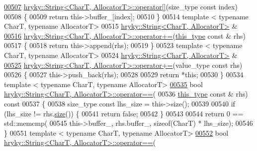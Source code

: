 \begin{DoxyCode}
\hypertarget{string_8h_source_l00507}{}\hyperlink{classhryky_1_1_string_a069059a9fefbffa776be63db1594561b}{00507} \hyperlink{classhryky_1_1_string}{hryky::String<CharT, AllocatorT>::operator[]}(size\_type \textcolor{keyword}{const} index)
00508 \{
00509     \textcolor{keywordflow}{return} this->buffer\_[index];
00510 \}
00514 \textcolor{keyword}{template} < \textcolor{keyword}{typename} CharT, \textcolor{keyword}{typename} AllocatorT>
00515 \hyperlink{classhryky_1_1_string}{hryky::String<CharT, AllocatorT>} &
\hypertarget{string_8h_source_l00516}{}\hyperlink{classhryky_1_1_string_a96d9ab83efd313311b3dc6f659b16027}{00516} \hyperlink{classhryky_1_1_string}{hryky::String<CharT, AllocatorT>::operator+=}(\hyperlink{classhryky_1_1_string}{this_type} \textcolor{keyword}{const} & rhs)
00517 \{
00518     \textcolor{keywordflow}{return} this->append(rhs);
00519 \}
00523 \textcolor{keyword}{template} < \textcolor{keyword}{typename} CharT, \textcolor{keyword}{typename} AllocatorT>
00524 \hyperlink{classhryky_1_1_string}{hryky::String<CharT, AllocatorT>} &
\hypertarget{string_8h_source_l00525}{}\hyperlink{classhryky_1_1_string_ad08fc0721b2e71f6e843a638569d8f93}{00525} \hyperlink{classhryky_1_1_string}{hryky::String<CharT, AllocatorT>::operator+=}(value\_type \textcolor{keyword}{const} rhs)
00526 \{
00527     this->push\_back(rhs);
00528 
00529     \textcolor{keywordflow}{return} *\textcolor{keyword}{this};
00530 \}
00534 \textcolor{keyword}{template} < \textcolor{keyword}{typename} CharT, \textcolor{keyword}{typename} AllocatorT>
\hypertarget{string_8h_source_l00535}{}\hyperlink{classhryky_1_1_string_a4480f7768eb5a9afce82696513af50e9}{00535} \textcolor{keywordtype}{bool} \hyperlink{namespacehryky_a96bfe0df0a09db56e7253330de4f2243}{hryky::String<CharT, AllocatorT>::operator==}(
00536     \hyperlink{classhryky_1_1_string}{this_type} \textcolor{keyword}{const} & rhs)\textcolor{keyword}{ const}
00537 \textcolor{keyword}{}\{
00538     size\_type \textcolor{keyword}{const} lhs\_size = this->size();
00539     
00540     \textcolor{keywordflow}{if} (lhs\_size != rhs.\hyperlink{classhryky_1_1_string_a9db0f71dce7b2de86a54ab5323759265}{size}()) \{
00541         \textcolor{keywordflow}{return} \textcolor{keyword}{false};
00542     \}
00543     
00544     \textcolor{keywordflow}{return} 0 == std::memcmp(
00545         this->buffer\_, rhs.buffer\_, \textcolor{keyword}{sizeof}(CharT) * lhs\_size);
00546 \}
00551 \textcolor{keyword}{template} < \textcolor{keyword}{typename} CharT, \textcolor{keyword}{typename} AllocatorT>
\hypertarget{string_8h_source_l00552}{}\hyperlink{classhryky_1_1_string_a48283b80979ce1e09ac69f915ac4209f}{00552} \textcolor{keywordtype}{bool} \hyperlink{namespacehryky_a96bfe0df0a09db56e7253330de4f2243}{hryky::String<CharT, AllocatorT>::operator==}(

\end{DoxyCode}
